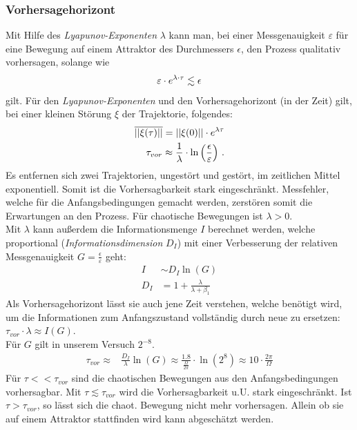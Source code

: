 \documentclass[numbers=noenddot,12pt,a4paper]{scrartcl}
\newcommand{\tilt}[1]{\textit{#1}}
\newcommand{\euler}{\mathnormal{e}}
\begin{document}
\subsubsection{Vorhersagehorizont}
Mit Hilfe des \tilt{Lyapunov-Exponenten} $\lambda$ kann man, bei einer Messgenauigkeit $\varepsilon$ für eine Bewegung auf einem Attraktor des Durchmessers $\epsilon$, den Prozess qualitativ vorhersagen, solange wie
\begin{align}
\varepsilon\cdot\euler^{\lambda\cdot \tau}\lesssim\epsilon
\end{align}
gilt. Für den \tilt{Lyapunov-Exponenten} und den Vorhersagehorizont (in der Zeit) gilt, bei einer kleinen Störung $\xi$ der Trajektorie, folgendes:
\begin{align}
\overline{||\xi(\tau)||}=||\xi(0)||\cdot\euler^{\lambda\tau} \\
\tau_{vor}\approx\frac{1}{\lambda}\cdot\ln\left(\frac{\epsilon}{\varepsilon}\right) \, .
\end{align}
Es entfernen sich zwei Trajektorien, ungestört und gestört, im zeitlichen Mittel exponentiell. Somit ist die Vorhersagbarkeit stark eingeschränkt. Messfehler, welche für die Anfangsbedingungen gemacht werden, zerstören somit die Erwartungen an den Prozess. Für chaotische Bewegungen ist $\lambda>0$.\\
Mit $\lambda$ kann außerdem die Informationsmenge $I$ berechnet werden, welche proportional (\tilt{Informationsdimension} $D_I$) mit einer Verbesserung der relativen Messgenauigkeit $G=\frac{\epsilon}{\varepsilon}$ geht:
\begin{align}
I&\sim D_I\ln\left(G\right) \\ D_I&=1+\frac{\lambda}{\lambda+\beta_1}
\end{align}
Als Vorhersagehorizont lässt sie auch jene Zeit verstehen, welche benötigt wird, um die Informationen zum Anfangszustand vollständig durch neue zu ersetzen: $\tau_{vor}\cdot\lambda\approx I(G)$.\\
Für $G$ gilt in unserem Versuch $2^{-8}$. 
\begin{align}
\tau_{vor}\approx& \frac{D_I}{\lambda}\ln\left(G\right) \approx\frac{1.8}{\frac{\Omega}{2\pi}}\cdot\ln\left(2^8\right)\approx 10\cdot\frac{2\pi}{\Omega}
\end{align}
Für \underline{$\tau<<\tau_{vor}$} sind die chaotischen Bewegungen aus den Anfangsbedingungen vorhersagbar.
Mit \underline{$\tau\lesssim\tau_{vor}$} wird die Vorhersagbarkeit u.U. stark eingeschränkt.
Ist \underline{$\tau>\tau_{vor}$}, so lässt sich die chaot. Bewegung nicht mehr vorhersagen. Allein ob sie auf einem Attraktor stattfinden wird kann abgeschätzt werden.
\end{document}
